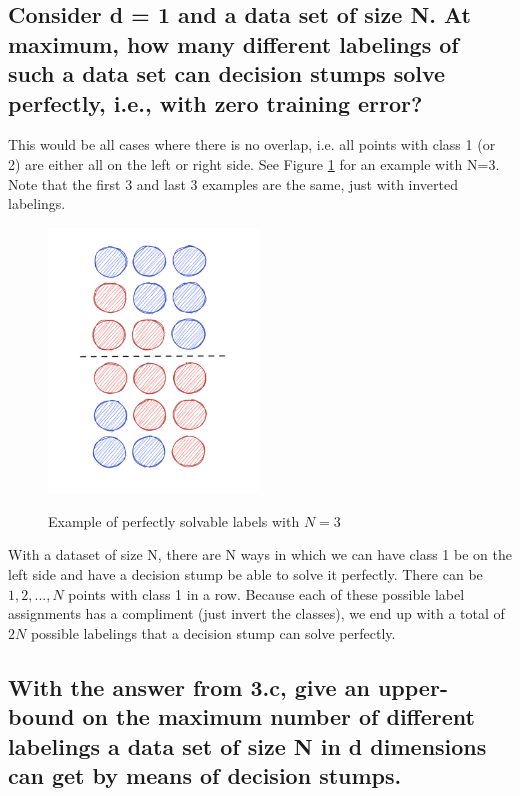 \documentclass[11pt,a4paper]{article}
\begin{document}
\subsection{Consider d = 1 and a data set of size N. At maximum, how many different labelings of
such a data set can decision stumps solve perfectly, i.e., with zero training error?}
\label{sec:2c}
This would be all cases where there is no overlap, i.e. all points with class 1 (or 2) are either all on the left or right side. See Figure \ref{fig:d1n3} for an example with N=3. Note that the first 3 and last 3 examples are the same, just with inverted labelings.

\begin{figure}[h]
    \caption{Example of perfectly solvable labels with $N=3$}
    \centering
    \includegraphics[width=0.5\textwidth]{d1n3_possibilities.png}
    \label{fig:d1n3}
\end{figure}

With a dataset of size N, there are N ways in which we can have class 1 be on the left side and have a decision stump be able to solve it perfectly. There can be $1, 2, ..., N$ points with class 1 in a row.
Because each of these possible label assignments has a compliment (just invert the classes), we end up with a total of $2N$ possible labelings that a decision stump can solve perfectly.


\subsection{With the answer from 3.c, give an upper-bound on the maximum number of different
labelings a data set of size N in d dimensions can get by means of decision stumps.}
\label{sec:2d}
\end{document}
